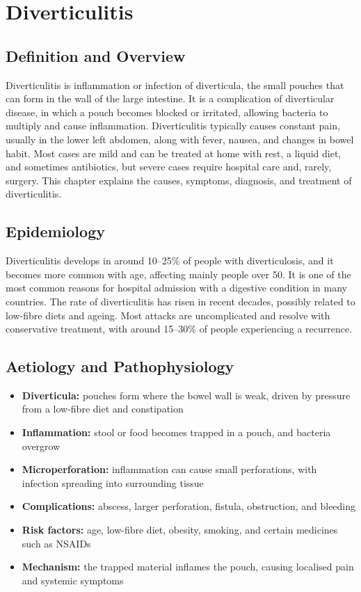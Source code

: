 \chapter{Diverticulitis}

\section*{Definition and Overview}
Diverticulitis is inflammation or infection of diverticula, the small pouches that can form in the wall of the large intestine. It is a complication of diverticular disease, in which a pouch becomes blocked or irritated, allowing bacteria to multiply and cause inflammation. Diverticulitis typically causes constant pain, usually in the lower left abdomen, along with fever, nausea, and changes in bowel habit. Most cases are mild and can be treated at home with rest, a liquid diet, and sometimes antibiotics, but severe cases require hospital care and, rarely, surgery. This chapter explains the causes, symptoms, diagnosis, and treatment of diverticulitis.

\section*{Epidemiology}
Diverticulitis develops in around 10--25\% of people with diverticulosis, and it becomes more common with age, affecting mainly people over 50. It is one of the most common reasons for hospital admission with a digestive condition in many countries. The rate of diverticulitis has risen in recent decades, possibly related to low-fibre diets and ageing. Most attacks are uncomplicated and resolve with conservative treatment, with around 15--30\% of people experiencing a recurrence.

\section*{Aetiology and Pathophysiology}
\begin{itemize}
    \item \textbf{Diverticula:} pouches form where the bowel wall is weak, driven by pressure from a low-fibre diet and constipation
    \item \textbf{Inflammation:} stool or food becomes trapped in a pouch, and bacteria overgrow
    \item \textbf{Microperforation:} inflammation can cause small perforations, with infection spreading into surrounding tissue
    \item \textbf{Complications:} abscess, larger perforation, fistula, obstruction, and bleeding
    \item \textbf{Risk factors:} age, low-fibre diet, obesity, smoking, and certain medicines such as NSAIDs
    \item \textbf{Mechanism:} the trapped material inflames the pouch, causing localised pain and systemic symptoms
\end{itemize}


